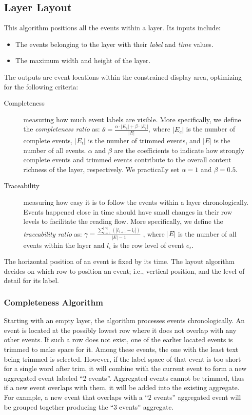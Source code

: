 \subsection{Layer Layout}
This algorithm positions all the events within a layer. Its inputs include:
\begin{itemize}
	\item The events belonging to the layer with their \emph{label} and \emph{time} values.
	\item The maximum width and height of the layer.
\end{itemize}
The outputs are event locations within the constrained display area, optimizing for the following criteria:
\begin{description}
	\item[Completeness] measuring how much event labels are visible. More specifically, we define the \emph{completeness ratio} as:
	$\theta = \frac{\alpha \cdot |E_c| + \beta \cdot |E_t|}{|E|}$, where $|E_c|$ is the number of complete events, $|E_t|$ is the number of trimmed events, and $|E|$ is the number of all events. $\alpha$ and $\beta$ are the coefficients to indicate how strongly complete events and trimmed events contribute to the overall content richness of the layer, respectively. We practically set $\alpha=1$ and $\beta=0.5$.

	\item[Traceability] measuring how easy it is to follow the events within a layer chronologically. Events happened close in time should have small changes in their row levels to facilitate the reading flow. More specifically, we define the \emph{traceability ratio} as:
	$\gamma=\frac{\sum\limits_{i=1}^{|E|}(|l_{i+1} - l_i|)}{|E|-1}$	, where $|E|$ is the number of all events within the layer and $l_i$ is the row level of event $e_i$.
\end{description}

The horizontal position of an event is fixed by its time. The layout algorithm decides on which row to position an event; i.e., vertical position,  and the level of detail for its label.

\subsubsection{Completeness Algorithm}
Starting with an empty layer, the algorithm processes events chronologically. An event is located at the possibly lowest row where it does not overlap with any other events. If such a row does not exist, one of the earlier located events is trimmed to make space for it. Among these events, the one with the least text being trimmed is selected. However, if the label space of that event is too short for a single word after trim, it will combine with the current event to form a new aggregated event labeled ``2 events''. Aggregated events cannot be trimmed, thus if a new event overlaps with them, it will be added into the existing aggregate. For example, a new event that overlaps with a ``2 events'' aggregated event will be grouped together producing the ``3 events'' aggregate.

